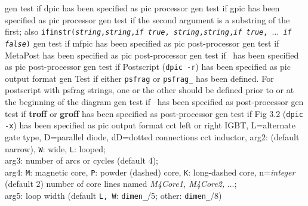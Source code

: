 %
  {gen}%
  {test if dpic has been specified as pic processor}%
%
  {gen}%
  {test if gpic has been specified as pic processor}%
%
  {gen}%
  {test if the second argument is a substring of the first; also
  {\tt ifinstr({\sl string},{\sl string},{\sl if true},{\sl
  string},{\sl string},{\sl if true}, $\ldots$ {\sl if false})} }%
%
  {gen}%
  {test if mfpic has been specified as pic post-processor}%
%
  {gen}%
  {test if MetaPost has been specified as pic post-processor}%
%
  {gen}%
  {test if \TPGF~has been specified as pic post-processor}%
%
  {gen}%
  {test if Postscript ({\tt dpic -r}) has been specified as pic output format}%
%
  {gen}%
  {Test if either {\tt psfrag} or {\tt psfrag\_} has been defined. For
   postscript with psfrag strings, one or the other should be defined
   prior to or at the beginning of the diagram}%
%
  {gen}%
  {test if \PSTricks~has been specified as post-processor}%
%
  {gen}%
  {test if {\bf troff} or {\bf groff} has been specified as post-processor}%
%
  {gen}%
  {test if Fig 3.2 ({\tt dpic -x}) has been specified as pic output format}%
%
  {cct}%
  {left or right IGBT, L=alternate gate type, D=parallel diode,
   dD=dotted connections }%
%
  {cct}%
  {inductor, arg2: (default narrow), {\tt W}: wide, {\tt L}: looped;\\
   arg3: number of arcs or cycles (default 4);\\
   arg4:
   {\tt M}: magnetic core,
   {\tt P}: powder (dashed) core,
   {\tt K}: long-dashed core,
     n={\sl integer} (default 2) number of core lines named
     {\sl M4Core1, M4Core2,} $\ldots$;\\
   arg5: loop width (default {\tt L, W}: {\tt dimen\_}/5;
     other: {\tt dimen\_}/8)
   }%
%
